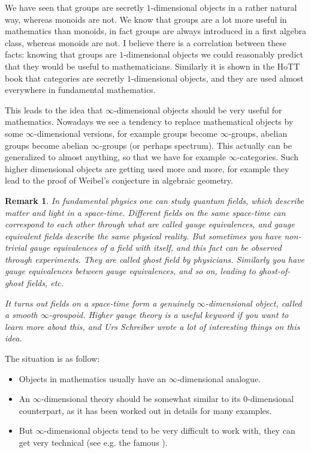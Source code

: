 \documentclass{article}
\newtheorem{remark}{Remark}
\begin{document}
We have seen that groups are secretly $1$-dimensional objects in a rather natural way, whereas monoids are not. We know that groups are a lot more useful in mathematics than monoids, in fact groups are always introduced in a first algebra class, whereas monoids are not. I believe there is a correlation between these facts: knowing that groups are $1$-dimensional objects we could reasonably predict that they would be useful to mathematicians. Similarly it is shown in the HoTT book that categories are secretly $1$-dimensional objects, and they are used almost everywhere in fundamental mathematics.

This leads to the idea that $\infty$-dimensional objects should be very useful for mathematics. Nowadays we see a tendency to replace mathematical objects by some $\infty$-dimensional versions, for example groups become $\infty$-groups, abelian groups become abelian $\infty$-groups (or perhaps spectrum). This actually can be generalized to almost anything, so that we have for example $\infty$-categories. Such higher dimensional objects are getting used more and more, for example they lead to the proof of Weibel's conjecture in algebraic geometry.

\begin{remark}
In fundamental physics one can study quantum fields, which describe matter and light in a space-time. Different fields on the same space-time can correspond to each other through what are called gauge equivalences, and gauge equivalent fields describe the same physical reality. But sometimes you have non-trivial gauge equivalences of a field with itself, and this fact can be observed through experiments. They are called ghost field by physicians. Similarly you have gauge equivalences between gauge equivalences, and so on, leading to ghost-of-ghost fields, etc.

It turns out fields on a space-time form a genuinely $\infty$-dimensional object, called a smooth $\infty$-groupoid. \emph{Higher gauge theory} is a useful keyword if you want to learn more about this, and Urs Schreiber wrote a lot of interesting things on this idea.
\end{remark}

The situation is as follow:
\begin{itemize}
\item Objects in mathematics usually have an $\infty$-dimensional analogue.
\item An $\infty$-dimensional theory should be somewhat similar to its $0$-dimensional counterpart, as it has been worked out in details for many examples.
\item But $\infty$-dimensional objects tend to be very difficult to work with, they can get very technical (see e.g. the famous \cite{lurie2009higher}).
\end{itemize}
\end{document}
